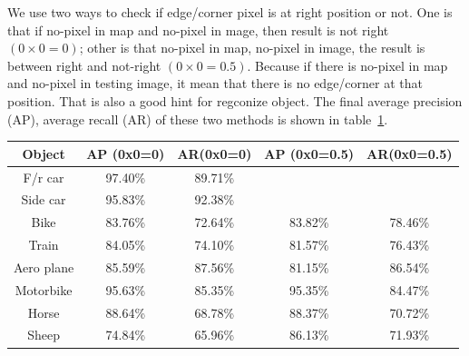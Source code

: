 We use two ways to check if edge/corner pixel is at right position or
not. One is that if no-pixel in map and no-pixel in mage, then result
is not right $(0\times 0=0)$; other is that no-pixel in map, no-pixel in image,
the result is between right and not-right $(0\times 0=0.5)$. Because if there
is no-pixel in map and no-pixel in testing image, it mean that there
is no edge/corner at that position. That is also a good hint for
regconize object. The final average precision (AP), average recall
(AR) of these two methods is shown in table~\ref{table:compare_0_5}.
\begin{table}[htbp]
\centering
\small
\begin{tabular}{|c||c|c||c|c|}%
    \hline 
     Object &  AP (0x0=0) & AR(0x0=0) & AP (0x0=0.5)  & AR(0x0=0.5)  \\ \hline 
     F/r car & 97.40\% & 89.71\% & & \\ \hline
     Side car & 95.83\% & 92.38\% & & \\ \hline
	 Bike & 83.76\% & 72.64\% & 83.82\% & 78.46\% \\ \hline
	Train & 84.05\% & 74.10\% & 81.57\% & 76.43\% \\ \hline
	Aero plane & 85.59\% & 87.56\% & 81.15\% & 86.54\% \\ \hline
	Motorbike & 95.63\% & 85.35\% & 95.35\% & 84.47\% \\ \hline
	Horse & 88.64\% & 68.78\% & 88.37\% & 70.72\% \\ \hline
	Sheep & 74.84\% & 65.96\% & 86.13\% & 71.93\% \\ \hline 
\end{tabular}
\label{table:compare_0_5}
\end{table}
